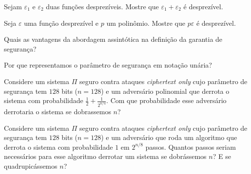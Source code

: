 \begin{exercicio}
  Sejam $\varepsilon_1$ e $\varepsilon_2$ duas funções desprezíveis.
  Mostre que $\varepsilon_1 + \varepsilon_2$ é desprezível.
\end{exercicio}

\begin{exercicio}
  Seja $\varepsilon$ uma função desprezível e $p$ um polinômio.
  Mostre que $p\varepsilon$ é desprezível.
\end{exercicio}

\begin{exercicio}
  Quais as vantagens da abordagem assintótica na definição da garantia de segurança?
\end{exercicio}

\begin{exercicio}
  Por que representamos o parâmetro de segurança em notação unária?
\end{exercicio}

\begin{exercicio}
  Considere um sistema $\Pi$ seguro contra ataques {\em ciphertext only} cujo parâmetro de segurança tem $128$ bits ($n = 128$) e um adversário polinomial que derrota o sistema com probabilidade $\frac{1}{2} + \frac{1}{2^{n/4}}$.
Com que probabilidade esse adversário derrotaria o sistema se dobrassemos $n$?
\end{exercicio}

\begin{exercicio}
  Considere um sistema $\Pi$ seguro contra ataques {\em ciphertext only} cujo parâmetro de segurança tem $128$ bits ($n = 128$) e um adversário que roda um algoritmo que derrota o sistema com probabilidade $1$ em $2^{n/8}$ passos.
  Quantos passos seriam necessários para esse algoritmo derrotar um sistema se dobrássemos $n$? E se quadrupicássemos $n$?
\end{exercicio}
